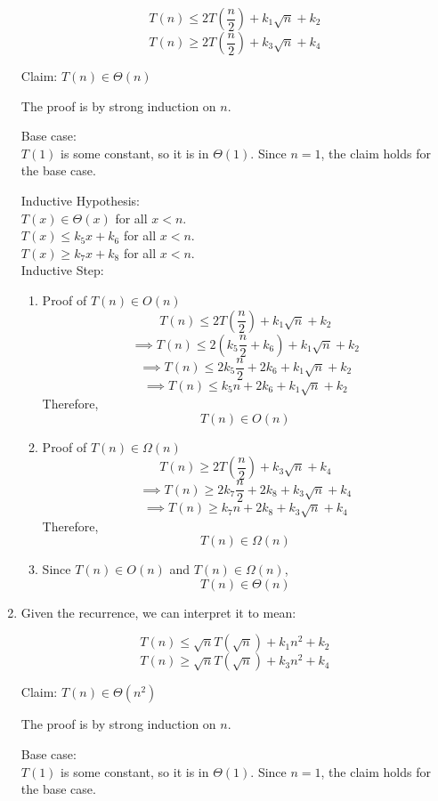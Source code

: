\documentclass[11pt,letterpaper]{article}
\begin{document}
\begin{enumerate}
$$ T(n) \leq 2 T(\frac{n}{2}) + k_1 \sqrt{n} + k_2 $$
$$ T(n) \geq 2 T(\frac{n}{2}) + k_3 \sqrt{n} + k_4 $$

Claim: $ T(n) \in \Theta(n) $

The proof is by strong induction on $n$.

Base case:\\
$ T(1) $ is some constant, so it is in $ \Theta(1) $.
Since $ n = 1 $, the claim holds for the base case.

Inductive Hypothesis:\\
$ T(x) \in \Theta(x) $ for all $ x < n $. \\
$ T(x) \leq k_5 x + k_6 $ for all $ x < n $. \\
$ T(x) \geq k_7 x + k_8 $ for all $ x < n $. \\

Inductive Step:\\
\begin{enumerate}
\item
  Proof of $ T(n) \in O(n) $
           $$ T(n) \leq 2 T(\frac{n}{2}) + k_1 \sqrt{n} + k_2 $$
  $$ \implies T(n) \leq 2 (k_5 \frac{n}{2} + k_6) + k_1 \sqrt{n} + k_2 $$
  $$ \implies T(n) \leq 2 k_5 \frac{n}{2} + 2 k_6 + k_1 \sqrt{n} + k_2 $$
  $$ \implies T(n) \leq k_5 n + 2 k_6 + k_1 \sqrt{n} + k_2 $$
  Therefore, $$ T(n) \in O(n) $$

\item
  Proof of $ T(n) \in \Omega(n) $
           $$ T(n) \geq 2 T(\frac{n}{2}) + k_3 \sqrt{n} + k_4 $$
  $$ \implies T(n) \geq 2 k_7 \frac{n}{2} + 2 k_8 + k_3 \sqrt{n} + k_4 $$
  $$ \implies T(n) \geq k_7 n + 2 k_8 + k_3 \sqrt{n} + k_4 $$
  Therefore, $$ T(n) \in \Omega(n) $$

\item
  Since $ T(n) \in O(n) $ and $ T(n) \in \Omega(n) $,
  $$ T(n) \in \Theta(n) $$
\end{enumerate}

\item
Given the recurrence, we can interpret it to mean:

$$ T(n) \leq \sqrt{n} T(\sqrt{n}) + k_1 n^2 + k_2 $$
$$ T(n) \geq \sqrt{n} T(\sqrt{n}) + k_3 n^2 + k_4 $$

Claim: $ T(n) \in \Theta(n^2) $

The proof is by strong induction on $n$.

Base case:\\
$ T(1) $ is some constant, so it is in $ \Theta(1) $.
Since $ n = 1 $, the claim holds for the base case.


\end{enumerate}
\end{document}

